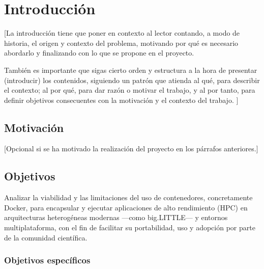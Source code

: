 \chapter{Introducción}\label{cap:introduccion}

[La introducción tiene que poner en contexto al lector contando, a modo de historia, el origen y contexto del problema, motivando por qué es necesario abordarlo y finalizando con lo que se propone en el proyecto.

   También es importante que sigas cierto orden y estructura a la hora de presentar (introducir) los contenidos, siguiendo un patrón que atienda al qué, para describir el contexto; al por qué, para dar razón o motivar el trabajo, y al por tanto, para definir objetivos consecuentes con la motivación y el contexto del trabajo.
]



\section{Motivación}\label{sec:motivacion}
[Opcional si se ha motivado la realización del proyecto en los párrafos anteriores.]

\section{Objetivos}\label{sec:objetivos}

Analizar la viabilidad y las limitaciones del uso de contenedores, concretamente Docker, para encapsular y ejecutar aplicaciones de alto rendimiento (HPC) en arquitecturas heterogéneas modernas —como big.LITTLE— y entornos multiplataforma, con el fin de facilitar su portabilidad, uso y adopción por parte de la comunidad científica.

\subsection{Objetivos específicos}\label{subsec:objetivos_especificos}

